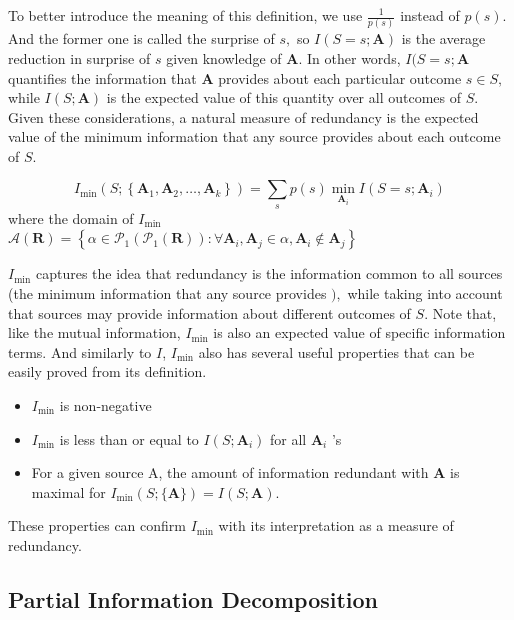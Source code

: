 To better introduce the meaning of this definition, we use $\frac{1}{p(s)}$ instead of ${p(s)}$. And the former one is called the surprise of $s,$ so $I(S=s ; \mathbf{A})$ is the average reduction in surprise of $s$ given knowledge of $\mathbf{A} .$ In other words, $I(S=s ;\mathbf{ A}$ quantifies the information that $\mathbf{A}$ provides about each particular outcome $s \in S,$ while $I(S ; \mathbf{A})$ is the expected value of this quantity over all outcomes of $S$. Given these considerations, a natural measure of redundancy is the expected value of the minimum information that any source provides about each outcome of $S$.
\begin{definition}
\begin{equation}I_{\min }\left(S ;\left\{\mathbf{A}_{1}, \mathbf{A}_{2}, \ldots, \mathbf{A}_{k}\right\}\right)=\sum_{s} p(s) \min _{\mathbf{A}_{i}} I\left(S=s ; \mathbf{A}_{i}\right)\end{equation}
where the domain of $I_{\min}$ $\mathcal{A}(\mathbf{R})=\left\{\alpha \in \mathcal{P}_{1}\left(\mathcal{P}_{1}(\mathbf{R})\right): \forall \mathbf{A}_{i}, \mathbf{A}_{j} \in \alpha, \mathbf{A}_{i} \notin \mathbf{A}_{j}\right\}$
\end{definition}
$I_{\min }$ captures the idea that redundancy is the information common to all sources (the minimum information that any source provides $),$ while taking into account that sources may provide information about different outcomes of $S$. Note that, like the mutual information, $I_{\min }$ is also an expected value of specific information terms. And similarly to $I$, $I_{\min }$ also has several useful properties that can be easily proved from its definition.
\begin{itemize}
    \item $I_{\min}$ is non-negative
    \item $I_{\min }$ is less than or equal to $I\left(S ; \mathbf{A}_{i}\right)$ for all $\mathbf{A}_{i}$ 's
    \item For a given source A, the amount of information redundant with $\mathbf{A}$ is maximal for $I_{\min }(S ;\{\mathbf{A}\})=I(S ; \mathbf{A}) .$
\end{itemize}

These properties can confirm $I_{\min}$ with its interpretation as a measure of redundancy.





\subsection{Partial Information Decomposition}
\label{sec:partialdecompositon}

